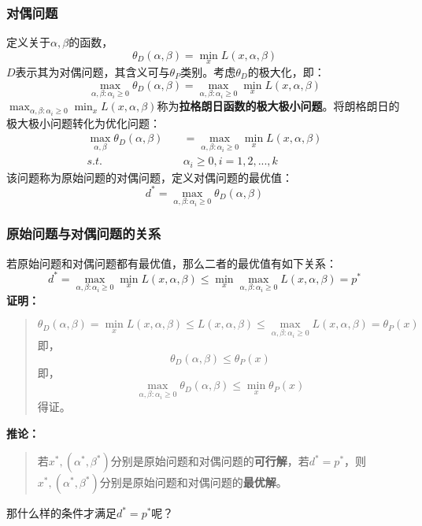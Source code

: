 \subsubsection{对偶问题}
定义关于$\alpha, \beta$的函数，
$$
\theta_D(\alpha, \beta) = \mathop{min}_{x} L(x, \alpha, \beta)
$$
$D$表示其为对偶问题，其含义可与$\theta_P$类别。考虑$\theta_D$的极大化，即：
$$
\mathop{max}_{\alpha, \beta: \alpha_i \geqslant 0} \theta_D(\alpha, \beta) = \mathop{max}_{\alpha, \beta: \alpha_i \geqslant 0} \mathop{min}_{x} L(x, \alpha, \beta)
$$
$\mathop{max}_{\alpha, \beta: \alpha_i \geqslant 0} \mathop{min}_{x} L(x, \alpha, \beta)$称为\textbf{拉格朗日函数的极大极小问题}。将朗格朗日的极大极小问题转化为优化问题：
\begin{align}
	\mathop{max}_{\alpha, \beta} \theta_D(\alpha, \beta)&\quad = \mathop{max}_{\alpha, \beta: \alpha_i \geqslant 0} \mathop{min}_{x} L(x, \alpha, \beta) \nonumber \\
	s.t.&\quad \alpha_i \geqslant 0, i = 1, 2, ..., k \nonumber
\end{align}
该问题称为原始问题的对偶问题，定义对偶问题的最优值：
$$
d^* = \mathop{max}_{\alpha, \beta: \alpha_i \geqslant 0} \theta_D(\alpha, \beta)
$$

\subsubsection{原始问题与对偶问题的关系}
若原始问题和对偶问题都有最优值，那么二者的最优值有如下关系：
$$
d^* = \mathop{max}_{\alpha, \beta: \alpha_i \geqslant 0} \mathop{min}_{x} L(x, \alpha, \beta) \leqslant \mathop{min}_{x} \mathop{max}_{\alpha, \beta: \alpha_i \geqslant 0} L(x, \alpha, \beta) = p^*
$$
\textbf{证明：}
\begin{quotation}
	$$
	\theta_D(\alpha, \beta) = \mathop{min}_{x} L(x, \alpha, \beta) \leqslant L(x, \alpha, \beta) \leqslant \mathop{max}_{\alpha, \beta: \alpha_i \geqslant 0} L(x, \alpha, \beta) = \theta_P(x)
	$$
	即，
	$$
	\theta_D (\alpha, \beta) \leqslant \theta_P (x)
	$$
	即，
	$$
	\mathop{max}_{\alpha, \beta:\alpha_i \geqslant 0} \theta_D (\alpha, \beta) \leqslant \mathop{min}_{x} \theta_P (x)
	$$
	得证。
\end{quotation}
\textbf{推论：}
\begin{quotation}
	若$x^*, (\alpha^*, \beta^*)$分别是原始问题和对偶问题的\textbf{可行解}，若$d^* = p^*$，则$x^*, (\alpha^*, \beta^*)$分别是原始问题和对偶问题的\textbf{最优解}。
\end{quotation} 
那什么样的条件才满足$d^* = p^*$呢？


